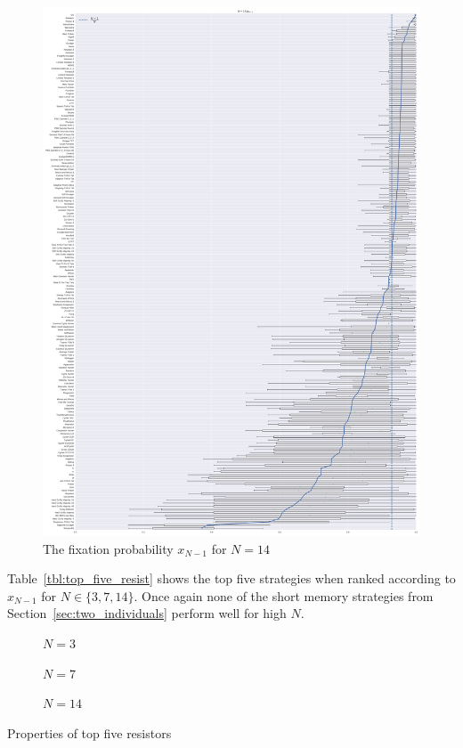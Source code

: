 \documentclass{article}
\begin{document}
\begin{figure}[!hbtp]
    \centering
    \includegraphics[height=.8\textheight]{./img/boxplot_14_resist.pdf}
    \caption{The fixation probability \(x_{N-1}\) for \(N=14\)}
    \label{fig:boxplot_14_resist}
\end{figure}

Table~\ref{tbl:top_five_resist} shows the top five strategies when ranked
according to \(x_{N-1}\) for \(N\in\{3, 7, 14\}\).
Once again none of the short memory strategies from
Section~\ref{sec:two_individuals} perform well for high \(N\).

\begin{table}[!hbtp]
    \begin{subfigure}[t]{\textwidth}
        \centering
        
        \caption{\(N=3\)}
    \end{subfigure}
    \begin{subfigure}[t]{\textwidth}
        \centering
        
        \caption{\(N=7\)}
    \end{subfigure}
    \begin{subfigure}[t]{\textwidth}
        \centering
        
        \caption{\(N=14\)}
    \end{subfigure}
    \caption{Properties of top five resistors}
    \label{tbl:top_five_resist}
\end{table}
\end{document}
